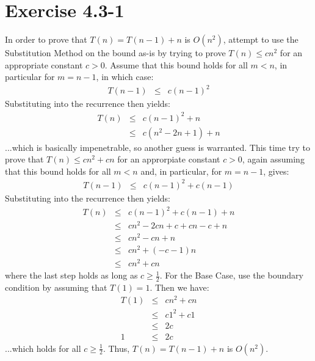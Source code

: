 \documentclass{article}
\begin{document}
\section*{Exercise 4.3-1}

In order to prove that $T(n) = T(n - 1) + n$ is $O(n^2)$, attempt to use the Substitution Method on the bound as-is by trying to prove $T(n) \leq cn^2$ for an appropriate constant $c > 0$.
Assume that this bound holds for all $m < n$, in particular for $m = n - 1$, in which case:
\begin{eqnarray*}
	T(n - 1) &\leq& c(n - 1)^2
\end{eqnarray*}
Substituting into the recurrence then yields:
\begin{eqnarray*}
	T(n) &\leq& c(n - 1)^2 + n \\
	 &\leq& c(n^2 - 2n + 1) + n
\end{eqnarray*}
...which is basically impenetrable, so another guess is warranted. This time try to prove that $T(n) \leq cn^2 + cn$ for an approrpiate constant $c > 0$, again assuming that this bound holds for all $m < n$ and, in particular, for $m = n - 1$, gives:
\begin{eqnarray*}
	T(n - 1) &\leq& c(n - 1)^2 + c(n - 1)
\end{eqnarray*}
Substituting into the recurrence then yields:
\begin{eqnarray*}
	T(n) &\leq& c(n - 1)^2 + c(n - 1) + n \\
	 &\leq& cn^2 - 2cn + c + cn - c + n \\
	 &\leq& cn^2 - cn + n \\
	 &\leq& cn^2 + (-c - 1)n \\
	 &\leq& cn^2 + cn
\end{eqnarray*}
where the last step holds as long as $c \geq \frac{1}{2}$.
For the Base Case, use the boundary condition by assuming that $T(1) = 1$. Then we have:
\begin{eqnarray*}
	T(1) &\leq& cn^2 + cn \\
	 &\leq& c1^2 + c1 \\
	 &\leq& 2c \\
	1 &\leq& 2c
\end{eqnarray*}
...which holds for all $c \geq \frac{1}{2}$.
Thus, $T(n) = T(n - 1) + n$ is $O(n^2)$.
\end{document}
